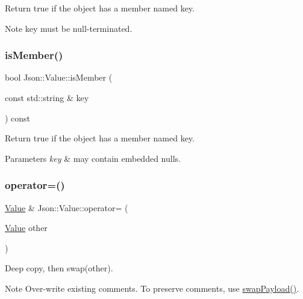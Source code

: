 Return true if the object has a member named key. \begin{DoxyNote}{Note}
\textquotesingle{}key\textquotesingle{} must be null-\/terminated. 
\end{DoxyNote}
\mbox{\label{class_json_1_1_value_a0a098bdc6ce5ade1722584c22297adac}} 
\subsubsection{\texorpdfstring{is\+Member()}{isMember()}\hspace{0.1cm}{\footnotesize\ttfamily [2/2]}}
{\footnotesize\ttfamily bool Json\+::\+Value\+::is\+Member (\begin{DoxyParamCaption}\item[{const std\+::string \&}]{key }\end{DoxyParamCaption}) const}

Return true if the object has a member named key. 
\begin{DoxyParams}{Parameters}
{\em key} & may contain embedded nulls. \\
\hline
\end{DoxyParams}
\mbox{\label{class_json_1_1_value_a795acb28772da4c5d85ae8f4af36c69f}} 
\subsubsection{\texorpdfstring{operator=()}{operator=()}}
{\footnotesize\ttfamily \hyperlink{class_json_1_1_value}{Value} \& Json\+::\+Value\+::operator= (\begin{DoxyParamCaption}\item[{\hyperlink{class_json_1_1_value}{Value}}]{other }\end{DoxyParamCaption})}

Deep copy, then swap(other). \begin{DoxyNote}{Note}
Over-\/write existing comments. To preserve comments, use \hyperlink{class_json_1_1_value_a5263476047f20e2fc6de470e4de34fe5}{swap\+Payload()}. 
\end{DoxyNote}
\mbox{\label{class_json_1_1_value_a7d99f5dba388cdaa152ce6ef933d64ef}} 
